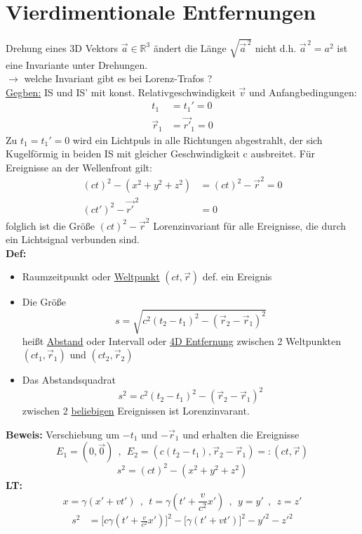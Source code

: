 \documentclass[titlepage,12pt,a4paper,ngerman]{report}
\begin{document}
{\section{Vierdimentionale Entfernungen}
Drehung eines 3D Vektors $ \vec{a} \in \mathbb{R}^3 $ ändert die Länge $ \sqrt{\vec{a}^{\,2}} $ nicht d.h. $ \vec{a}^{\, 2} = a^2 $ ist eine Invariante unter Drehungen.\\
$ \rightarrow $ welche Invariant gibt es bei Lorenz-Trafos ?\\[5pt]
\underline{Gegben:} IS und IS' mit konst. Relativgeschwindigkeit $ \vec{v} $ und Anfangbedingungen:
\begin{align*}
t_1 &= t_1' = 0\\
\vec{r}_1 &= \vec{r'}_1 = 0
\end{align*}
Zu $ t_1 = t_1' = 0 $ wird ein Lichtpuls in alle Richtungen abgestrahlt, der sich Kugelförmig in beiden IS mit gleicher Geschwindigkeit c ausbreitet. Für Ereignisse an der Wellenfront gilt:
\begin{align*}
(ct)^2 - (x^2 + y^2 + z^2) &= (ct)^2 - \vec{r}^2 = 0\\
(ct')^2 - \vec{r'}^{\, 2} &= 0
\end{align*}
folglich ist die Größe $ (ct)^2 - \vec{r}^2 $ Lorenzinvariant für alle Ereignisse, die durch ein Lichtsignal verbunden sind.\\
\textbf{Def:}
\begin{itemize}
	\item Raumzeitpunkt oder \underline{Weltpunkt} $ (ct,\vec{r}) $ def. ein Ereignis
	\item Die Größe
	$$s = \sqrt{c^2(t_2-t_1)^2 - (\vec{r}_2 - \vec{r}_1)^2}$$
	heißt \underline{Abstand} oder Intervall oder \underline{4D Entfernung} zwischen 2 Weltpunkten $ (ct_1,\vec{r}_1) $ und $ (ct_2,\vec{r}_2) $
	\item Das Abstandsquadrat
	$$s^2 = c^2 (t_2-t_1)^2- (\vec{r}_2 - \vec{r}_1)^2$$
	zwischen 2 \underline{beliebigen} Ereignissen ist Lorenzinvarant.
\end{itemize}
\textbf{Beweis:} Verschiebung um $ -t_1 $ und $ - \vec{r}_1 $ und erhalten die Ereignisse
$$E_1 = (0,\vec{0})\ \ , \ \ E_2 = (c(t_2-t_1) , \vec{r}_2 - \vec{r}_1) =: (ct,\vec{r})$$
$$s^2 = (ct)^2 - (x^2 + y^2 + z^2)$$
\textbf{LT:}
$$x = \gamma (x' + vt') \ \ , \ \ t = \gamma(t' + \frac{v}{c^2} x') \ \ , \ \ y = y' \ \ , \ \ z = z'$$
\begin{align*}
s^2 &= \bigg[c \gamma (t' + \frac{v}{c^2} x')\bigg]^2 - \bigg[\gamma (t' + vt')\bigg]^2 - y'^2 - z'^2\\

\end{align*}}
\end{document}

